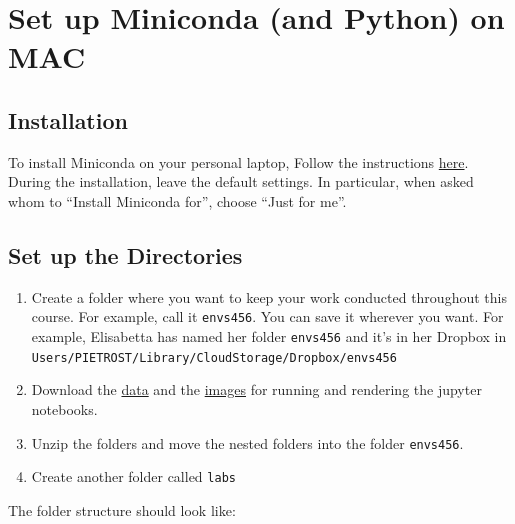\documentclass[
  letterpaper,
  DIV=11,
  numbers=noendperiod]{scrreprt}
\providecommand{\tightlist}{%
  \setlength{\itemsep}{0pt}\setlength{\parskip}{0pt}}\usepackage{longtable,booktabs,array}
\begin{document}
\section*{Set up Miniconda (and Python) on
MAC}\label{set-up-miniconda-and-python-on-mac}


\subsection*{Installation}\label{installation-1}

To install Miniconda on your personal laptop, Follow the instructions
\href{https://docs.conda.io/projects/miniconda/en/latest/miniconda-install.html}{here}.
During the installation, leave the default settings. In particular, when
asked whom to ``Install Miniconda for'', choose ``Just for me''.

\subsection*{Set up the Directories}\label{set-up-the-directories-1}

\begin{enumerate}
\def\labelenumi{\arabic{enumi}.}
\tightlist
\item
  Create a folder where you want to keep your work conducted throughout
  this course. For example, call it \texttt{envs456}. You can save it
  wherever you want. For example, Elisabetta has named her folder
  \texttt{envs456} and it's in her Dropbox in
  \texttt{Users/PIETROST/Library/CloudStorage/Dropbox/envs456}
\item
  Download the
  \href{https://minhaskamal.github.io/DownGit/\#/home?url=https://github.com/GDSL-UL/wma/tree/main/data}{data}
  and the
  \href{https://minhaskamal.github.io/DownGit/\#/home?url=https://github.com/GDSL-UL/wma/tree/main/labs_img}{images}
  for running and rendering the jupyter notebooks.
\item
  Unzip the folders and move the nested folders into the folder
  \texttt{envs456}.
\item
  Create another folder called \texttt{labs}
\end{enumerate}

The folder structure should look like:
\end{document}
